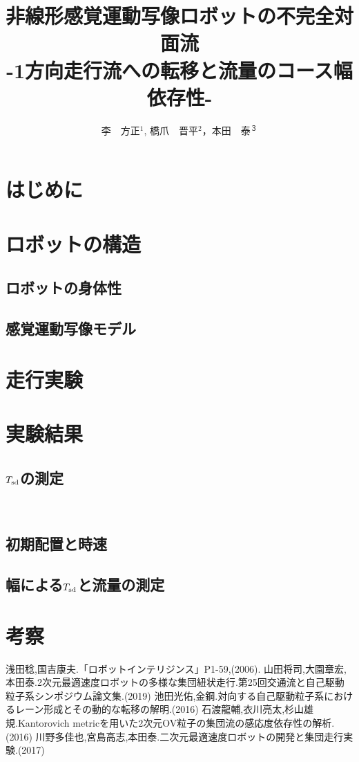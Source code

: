 \documentclass[twocolumn]{jarticle} %
\title{%
非線形感覚運動写像ロボットの不完全対面流\\
{\Large -1方向走行流への転移と流量のコース幅依存性-}
}
\author{%
李　方正$^1$, 橋爪　晋平$^2$，本田　泰$^３$
}
\affiliation{%
$^1$ 室蘭工業大学大学院　工学研究科　情報電子工学系専攻\\
$^2$ 室蘭工業大学　工学部　情報電子工学系学科\\
$^3$ 室蘭工業大学大学院　しくみ解明系領域
}
\begin{document}
\maketitle

\section{はじめに}
   
\section{ロボットの構造}
\subsection{ロボットの身体性}
   
\subsection{感覚運動写像モデル}
   
\section{走行実験}
   
\section{実験結果}
\subsection{$T_{\rm sd}$の測定}
　　
\subsection{初期配置と時速}
   
\subsection{幅による$T_{\rm sd}$と流量の測定}
   
\section{考察}
   

\begin{thebibliography}{99}
 浅田稔,国吉康夫.「ロボットインテリジンス」P1-59,(2006).
 山田将司,大園章宏,本田泰.2次元最適速度ロボットの多様な集団紐状走行.第25回交通流と自己駆動粒子系シンポジウム論文集.(2019)
 池田光佑,金鋼.対向する自己駆動粒子系におけるレーン形成とその動的な転移の解明.(2016)
 石渡龍輔,衣川亮太,杉山雄規.Kantorovich metricを用いた2次元OV粒子の集団流の感応度依存性の解析.(2016)
 川野多佳也,宮島高志,本田泰.二次元最適速度ロボットの開発と集団走行実験.(2017)
\end{thebibliography}
\end{document}
